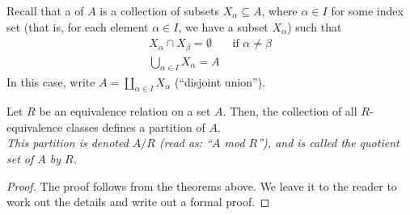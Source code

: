 \vspace*{1em}

\begin{remark}
Recall that a  of $A$ is a collection of subsets $X_\alpha \subseteq A$, where $\alpha \in I$ for some index set (that is, for each element $\alpha \in I$, we have a subset $X_\alpha$) such that
\begin{align*}
X_\alpha \cap X_\beta = \emptyset &\text{ if } \alpha \neq \beta\\[0.5em]
\bigcup_{\alpha \in I}X_\alpha = A
\end{align*}
In this case, write $\displaystyle A = \coprod_{\alpha \in I}X_\alpha$ (``disjoint union'').
\end{remark}

\vspace*{1em}

\begin{theorem}
Let $R$ be an equivalence relation on a set $A$. Then, the collection of all $R$-equivalence classes defines a partition of $A$.\\[0.5em]
\emph{This partition is denoted $A/R$ (read as: ``$A$ mod $R$''), and is called \emph{the quotient set of $A$ by $R$.}}
\end{theorem}
\begin{proof}
The proof follows from the theorems above. We leave it to the reader to work out the details and write out a formal proof.
\end{proof}

\vspace*{1em}

